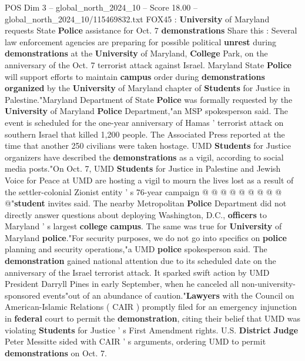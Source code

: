 \begin{textsample}{POS Dim 3 – global\_north\_2024\_10 – Score 18.00 – global\_north\_2024\_10/115469832.txt}  \label{ex:f3_pos_152}
FOX45 : \textbf{University} of Maryland requests State \textbf{Police} assistance for Oct. 7 \textbf{demonstrations} Share this : Several law enforcement agencies are preparing for possible political \textbf{unrest} during \textbf{demonstrations} at the \textbf{University} of Maryland, \textbf{College} Park, on the anniversary of the Oct. 7 terrorist attack against Israel.
Maryland State \textbf{Police} will support efforts to maintain \textbf{campus} order during \textbf{demonstrations} \textbf{organized} by the \textbf{University} of Maryland chapter of \textbf{Students} for Justice in Palestine."Maryland Department of State \textbf{Police} was formally requested by the \textbf{University} of Maryland \textbf{Police} Department,"an MSP spokesperson said.
The event is scheduled for the one-year anniversary of Hamas ' terrorist attack on southern Israel that killed 1,200 people.
The Associated Press reported at the time that another 250 civilians were taken hostage.
UMD \textbf{Students} for Justice organizers have described the \textbf{demonstrations} as a vigil, according to social media posts."On Oct. 7, UMD \textbf{Students} for Justice in Palestine and Jewish Voice for Peace at UMD are hosting a vigil to mourn the lives lost as a result of the settler-colonial Zionist entity ' s 76-year campaign @ @ @ @ @ @ @ @ @ @"\textbf{student} invites said.
The nearby Metropolitan \textbf{Police} Department did not directly answer questions about deploying Washington, D.C., \textbf{officers} to Maryland ' s largest \textbf{college} \textbf{campus}.
The same was true for \textbf{University} of Maryland \textbf{police}."For security purposes, we do not go into specifics on \textbf{police} planning and security operations,"a UMD \textbf{police} spokesperson said.
The \textbf{demonstration} gained national attention due to its scheduled date on the anniversary of the Israel terrorist attack.
It sparked swift action by UMD President Darryll Pines in early September, when he canceled all non-university-sponsored events"out of an abundance of caution."\textbf{Lawyers} with the Council on American-Islamic Relations ( CAIR ) promptly filed for an emergency injunction in \textbf{federal} court to permit the \textbf{demonstration}, citing their belief that UMD was violating \textbf{Students} for Justice ' s First Amendment rights.
U.S. \textbf{District} \textbf{Judge} Peter Messitte sided with CAIR ' s arguments, ordering UMD to permit \textbf{demonstrations} on Oct. 7.

\end{textsample}
